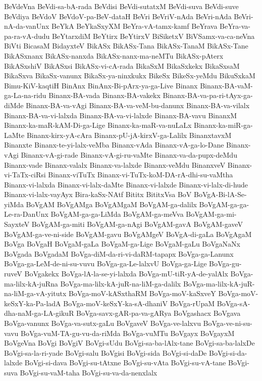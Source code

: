 {BeVdeVna
BeVdi-sa-bA-rada
BeVdisi
BeVdi-sutatxM
BeVdi-suva
BeVdi-suve
BeVdiya
BeVdoV
BeVdoV-pa-BeV-dataH
BeVri
BeVriV-nAda
BeVri-nAda
BeVri-nA-da-vanUnx
BeYkA
BeYkaSxyXM
BeYra-vA-tamx-kamf
BeYrava
BeYra-va-pa-ra-vA-dudu
BeYtarxdiM
BeYtirx
BeYtirxV
BiSiketxV
BiVSamx-va-ca-neVna
BiVti
BicasaM
BidayxteV
BikASx
BikASx-Tana
BikASx-TanaM
BikASx-Tane
BikASxnanx
BikASx-nanxda
BikASx-nanx-ma-neMTu
BikASx-pAterx
BikASxshiV
BikASxsi
BikASx-vi-cA-rada
BikaSxM
BikaSxkekx
BikaSxsaM
BikaSxva
BikaSx-vanunx
BikaSx-ya-ninxkukx
BikeSx
BikeSx-yeMdu
BikuSxkaM
Bimu-KiV-kaqtiH
BinAnx
BinAnx-Bi-pArx-ya-ga-Live
Binanx
Binanx-BA-vaM-ga-La-na-ridu
Binanx-BA-vada
Binanx-BA-vakekx
Binanx-BA-va-pa-ri-tAyx-ga-diMde
Binanx-BA-va-vAgi
Binanx-BA-va-veM-bu-danunx
Binanx-BA-va-vilalx
Binanx-BA-va-vi-lalxda
Binanx-BA-va-vi-lalxde
Binanx-BA-vavu
BinanxM
Binanx-ka-maR-kAM-Di-ga-Lige
Binanx-ka-maR-va-nuLaLx
Binanx-ka-miR-ga-LaMte
Binanx-kirx-yA-cAra
Binanx-pU-jA-kirxV-ga-Lalilx
BinanxtavxM
Binanxte
Binanx-te-yi-lalx-veMba
Binanx-vAda
Binanx-vA-ga-lo-Dane
Binanx-vAgi
Binanx-vA-gi-rade
Binanx-vA-gi-ru-vaMte
Binanx-va-da-pupx-deMdu
Binanx-vade
Binanx-valalx
Binanx-va-lalxde
Binanx-veMdu
BinanxveV
Binanx-vi-TaTx-ciRsi
Binanx-viTuTx
Binanx-vi-TuTx-koM-DA-rA-dhi-su-vaMtha
Binanx-vi-lalxda
Binanx-vi-lalx-daMte
Binanx-vi-lalxde
Binanx-vi-lalx-di-hude
Binanx-vi-lalx-vayAyx
Bira-kaSx-NAtf
Bititx
BititxVsa
BoV
BoVgA-Bi-lA-Se-yiMda
BoVgAM
BoVgAMga
BoVgAMgaM
BoVgAM-ga-dalilx
BoVgAM-ga-ga-Le-ra-DanUnx
BoVgAM-ga-ga-LiMda
BoVgAM-ga-meVva
BoVgAM-ga-mi-SayxteV
BoVgAM-ga-miti
BoVgAM-ga-nAgi
BoVgAM-gavA
BoVgAM-gaveV
BoVgAM-ga-ve-ni-side
BoVgAM-gavu
BoVgAMgeV
BoVgA-di-gaLa
BoVgAgaM
BoVga
BoVgaH
BoVgaM-gaLa
BoVgaM-ga-Lige
BoVgaM-gaLu
BoVgaNaNx
BoVgada
BoVgadaM
BoVga-diM-da-ri-vi-daRM-tapapx
BoVga-ga-Lanunx
BoVga-ga-LeM-de-ni-su-vuvu
BoVga-ga-Le-lalxvU
BoVga-ga-Lige
BoVga-gu-ruveV
BoVgakekx
BoVga-lA-la-se-yi-lalxda
BoVga-mU-tiR-yA-de-yalAlx
BoVga-ma-lilx-kA-juRna
BoVga-ma-lilx-kA-juR-na-liM-ga-dalilx
BoVga-ma-lilx-kA-juR-na-liM-ga-vA-yitutx
BoVga-moV-kASxthaRM
BoVga-moV-kaSxveY
BoVga-moV-keSxY-ka-Pa-ladA
BoVga-moV-keSxY-ka-sA-dhaniV
BoVga-rUpaM
BoVga-sA-dha-naM-ga-LA-gikuR
BoVga-savx-gAR-pa-va-gARya
BoVgashacx
BoVgava
BoVga-vanunx
BoVga-va-sutx-gaLu
BoVgaveV
BoVga-ve-lalxvu
BoVga-ve-ni-su-vavu
BoVga-vuM-TA-gu-vu-da-riMda
BoVga-vuMTu
BoVgayx
BoVgayxM
BoVgeVna
BoVgi
BoVgiV
BoVgi-sUdu
BoVgi-sa-ba-lAlx-tane
BoVgi-sa-ba-lalxDe
BoVgi-sa-la-ri-yade
BoVgi-salu
BoVgisi
BoVgi-sida
BoVgi-si-daDe
BoVgi-si-da-lalxde
BoVgi-si-dava
BoVgi-su-tAtxne
BoVgi-su-vAta
BoVgi-su-vA-tane
BoVgi-suva
BoVgi-su-vaM-taha
BoVgi-su-va-da-nenxlalx
}
